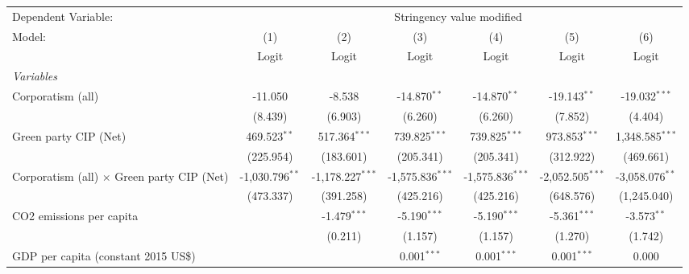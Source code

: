 
\begingroup
\centering
\begin{tabular}{lcccccc}
   \toprule
   Dependent Variable: & \multicolumn{6}{c}{Stringency value modified}\\
   Model:                                            & (1)               & (2)                & (3)                & (4)                & (5)                & (6)\\  
                                                     &  Logit            & Logit              & Logit              & Logit              & Logit              & Logit\\  
   \midrule
   \emph{Variables}\\
   Corporatism (all)                                 & -11.050           & -8.538             & -14.870$^{**}$     & -14.870$^{**}$     & -19.143$^{**}$     & -19.032$^{***}$\\   
                                                     & (8.439)           & (6.903)            & (6.260)            & (6.260)            & (7.852)            & (4.404)\\   
   Green party CIP (Net)                             & 469.523$^{**}$    & 517.364$^{***}$    & 739.825$^{***}$    & 739.825$^{***}$    & 973.853$^{***}$    & 1,348.585$^{***}$\\   
                                                     & (225.954)         & (183.601)          & (205.341)          & (205.341)          & (312.922)          & (469.661)\\   
   Corporatism (all) $\times$ Green party CIP (Net)  & -1,030.796$^{**}$ & -1,178.227$^{***}$ & -1,575.836$^{***}$ & -1,575.836$^{***}$ & -2,052.505$^{***}$ & -3,058.076$^{**}$\\   
                                                     & (473.337)         & (391.258)          & (425.216)          & (425.216)          & (648.576)          & (1,245.040)\\   
   CO2 emissions per capita                          &                   & -1.479$^{***}$     & -5.190$^{***}$     & -5.190$^{***}$     & -5.361$^{***}$     & -3.573$^{**}$\\   
                                                     &                   & (0.211)            & (1.157)            & (1.157)            & (1.270)            & (1.742)\\   
   GDP per capita (constant 2015 US\$)               &                   &                    & 0.001$^{***}$      & 0.001$^{***}$      & 0.001$^{***}$      & 0.000\\   

\end{tabular}
